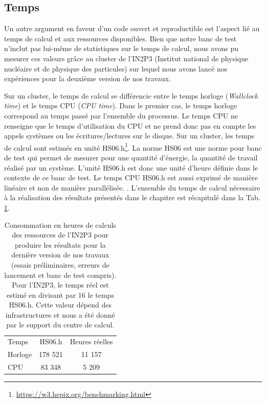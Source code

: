 \subsection{Temps}

Un autre argument en faveur d'un code ouvert et reproductible est l'aspect lié au temps de calcul et aux ressources disponibles. Bien que notre banc de test n'inclut pas lui-même de statistiques sur le temps de calcul, nous avons pu mesurer ces valeurs grâce au cluster de l'IN2P3 (Institut national de physique nucléaire et de physique des particules) sur lequel nous avons lancé nos expériences pour la deuxième version de nos travaux. 

Sur un cluster, le temps de calcul se différencie entre le temps horloge (\textit{Wallclock time}) et le temps CPU (\textit{CPU time}). Dans le premier cas, le temps horloge correspond au temps passé par l'ensemble du processus. Le temps CPU ne renseigne que le temps d'utilisation du CPU et ne prend donc pas en compte les appels systèmes ou les écritures/lectures sur le disque. Sur un cluster, les temps de calcul sont estimés en unité HS06.h\footnote{\url{https://w3.hepix.org/benchmarking.html}}. La norme HS06 est une norme pour banc de test qui permet de mesurer pour une quantité d'énergie, la quantité de travail réalisé par un système. L'unité HS06.h est donc une unité d'heure définie dans le contexte de ce banc de test. Le temps CPU HS06.h est aussi exprimé de manière linéaire et non de manière parallélisée. . L'ensemble du temps de calcul nécessaire à la réalisation des résultats présentés dans le chapitre \chapAnalysisN{} est récapitulé dans la Tab. \ref{tab:consumption_in2p3}.

\begin{table}
    \centering
    \begin{tabular}{lcc}
        \hline
        Temps         & HS06.h   & Heures réelles \\
        Horloge       &  178 521 &    11 157  \\
        CPU           &  83 348  &     5 209  \\
    \end{tabular}
    \caption{Consommation en heures de calculs des ressources de l'IN2P3 pour produire les résultats pour la dernière version de nos travaux (essais préliminaires, erreurs de lancement et banc de test compris). Pour l'IN2P3, le temps réel est estimé en divisant par 16 le temps HS06.h. Cette valeur dépend des infrastructures et nous a été donné par le support du centre de calcul.}
    \label{tab:consumption_in2p3}
\end{table}

